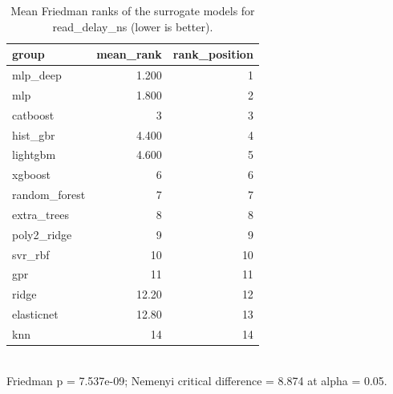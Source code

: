 \begin{table}[!t]
\centering
\caption{Mean Friedman ranks of the surrogate models for read_delay_ns (lower is better).}
\label{tab:statistics_surrogate_ranks_surrogate_read_delay_ns}
\footnotesize
\begin{tabular}{lrr}
\toprule
group & mean\_rank & rank\_position \\
\midrule
mlp\_deep & 1.200 & 1 \\
mlp & 1.800 & 2 \\
catboost & 3 & 3 \\
hist\_gbr & 4.400 & 4 \\
lightgbm & 4.600 & 5 \\
xgboost & 6 & 6 \\
random\_forest & 7 & 7 \\
extra\_trees & 8 & 8 \\
poly2\_ridge & 9 & 9 \\
svr\_rbf & 10 & 10 \\
gpr & 11 & 11 \\
ridge & 12.20 & 12 \\
elasticnet & 12.80 & 13 \\
knn & 14 & 14 \\
\bottomrule
\end{tabular}
\\[2pt] \footnotesize Friedman p = 7.537e-09; Nemenyi critical difference = 8.874 at alpha = 0.05.
\end{table}
